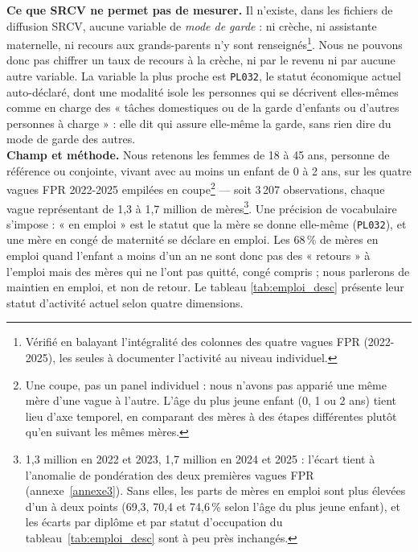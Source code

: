 \documentclass[12pt,a4paper]{article}
\begin{document}
\noindent \textbf{Ce que SRCV ne permet pas de mesurer.} Il n'existe, dans les fichiers de diffusion SRCV, aucune variable de \textit{mode de garde} : ni crèche, ni assistante maternelle, ni recours aux grands-parents n'y sont renseignés\footnote{Vérifié en balayant l'intégralité des colonnes des quatre vagues FPR (2022-2025), les seules à documenter l'activité au niveau individuel.}. Nous ne pouvons donc pas chiffrer un taux de recours à la crèche, ni par le revenu ni par aucune autre variable. La variable la plus proche est \texttt{PL032}, le statut économique actuel auto-déclaré, dont une modalité isole les personnes qui se décrivent elles-mêmes comme en charge des « tâches domestiques ou de la garde d'enfants ou d'autres personnes à charge » : elle dit qui assure elle-même la garde, sans rien dire du mode de garde des autres. \\

\noindent \textbf{Champ et méthode.} Nous retenons les femmes de 18 à 45 ans, personne de référence ou conjointe, vivant avec au moins un enfant de 0 à 2 ans, sur les quatre vagues FPR 2022-2025 empilées en coupe\footnote{Une coupe, pas un panel individuel : nous n'avons pas apparié une même mère d'une vague à l'autre. L'âge du plus jeune enfant (0, 1 ou 2 ans) tient lieu d'axe temporel, en comparant des mères à des étapes différentes plutôt qu'en suivant les mêmes mères.} — soit 3\,207 observations, chaque vague représentant de 1,3 à 1,7 million de mères\footnote{1,3 million en 2022 et 2023, 1,7 million en 2024 et 2025 : l'écart tient à l'anomalie de pondération des deux premières vagues FPR (annexe~\ref{annexe3}). Sans elles, les parts de mères en emploi sont plus élevées d'un à deux points (69,3, 70,4 et 74,6\,\% selon l'âge du plus jeune enfant), et les écarts par diplôme et par statut d'occupation du tableau~\ref{tab:emploi_desc} sont à peu près inchangés.}. Une précision de vocabulaire s'impose : « en emploi » est le statut que la mère se donne elle-même (\texttt{PL032}), et une mère en congé de maternité se déclare en emploi. Les 68\,\% de mères en emploi quand l'enfant a moins d'un an ne sont donc pas des « retours » à l'emploi mais des mères qui ne l'ont pas quitté, congé compris ; nous parlerons de maintien en emploi, et non de retour. Le tableau \ref{tab:emploi_desc} présente leur statut d'activité actuel selon quatre dimensions. \\

\bigskip
\end{document}
